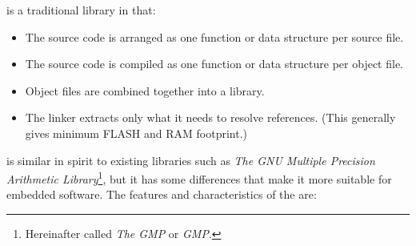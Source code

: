 \emph{\productbasenameshort{}} is a traditional
library in that:

\begin{itemize}
\item The source code is arranged as one function or data structure per source file.
\item The source code is compiled as one function or data structure per object file.
\item Object files are combined together into a library.
\item The linker extracts only what it needs to resolve references.  (This generally
      gives minimum FLASH and RAM footprint.)
\end{itemize}

\emph{\productbasenameshort{}} is similar in spirit to existing libraries such as
\emph{The GNU Multiple Precision Arithmetic Library}\footnote{Hereinafter called
\emph{The GMP} or \emph{GMP}.},
but it has some differences
that make it more suitable for embedded software.  The features and characteristics of the
\emph{\productbasenameshort{}} are:

